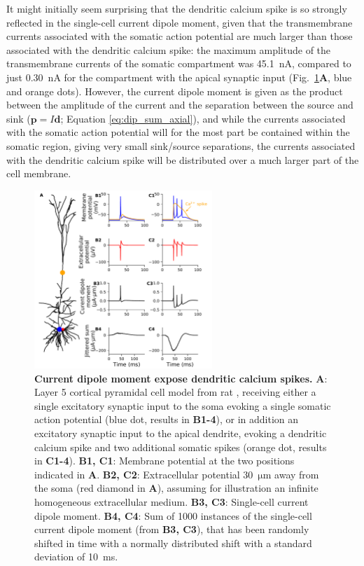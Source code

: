 \documentclass[preprint,10pt,authoryear]{elsarticle}
\begin{document}
It might initially seem surprising that the dendritic calcium spike is so strongly reflected in the single-cell current dipole moment, given that the transmembrane currents associated with the somatic action potential are much larger than those associated with the dendritic calcium spike: the maximum amplitude of the transmembrane currents of the somatic compartment was 45.1~$\si{\nA}$, compared to just 0.30~$\si{\nA}$ for the compartment with the apical synaptic input (Fig.~\ref{fig:ca_spike}{\bf A}, blue and orange dots). However, the current dipole moment is given as the product between the amplitude of the current and the separation between the source and sink ($\mathbf{p}=I\mathbf{d}$; Equation \ref{eq:dip_sum_axial}), and while the currents associated with the somatic action potential will for the most part be contained within the somatic region, giving very small sink/source separations, the currents associated with the dendritic calcium spike will be distributed over a much larger part of the cell membrane.

\begin{figure}[H]
	\centering
	\includegraphics[width=0.6\textwidth]{ca_spike_hay}
	\caption{\textbf{Current dipole moment expose dendritic calcium spikes.}
		\textbf{A}: Layer 5 cortical pyramidal cell model from rat \citep{HAY2011}, receiving either a single excitatory synaptic input to the soma evoking a single somatic action potential (blue dot, results in \textbf{B1-4}), or in addition an excitatory synaptic input to the apical dendrite, evoking a dendritic calcium spike and two additional somatic spikes (orange dot, results in \textbf{C1-4}). 
		\textbf{B1, C1}: Membrane potential at the two positions indicated in \textbf{A}.
		\textbf{B2, C2}: Extracellular potential 30~$\si{\um}$ away from the soma (red diamond in \textbf{A}), assuming for illustration an infinite homogeneous extracellular medium. 
		\textbf{B3, C3}: Single-cell current dipole moment. 
		\textbf{B4, C4}: Sum of 1000 instances of the single-cell current dipole moment (from \textbf{B3, C3}), that has been randomly shifted in time with a normally distributed shift with a standard deviation of 10~ms.
	}
	\label{fig:ca_spike}
\end{figure}
\end{document}

